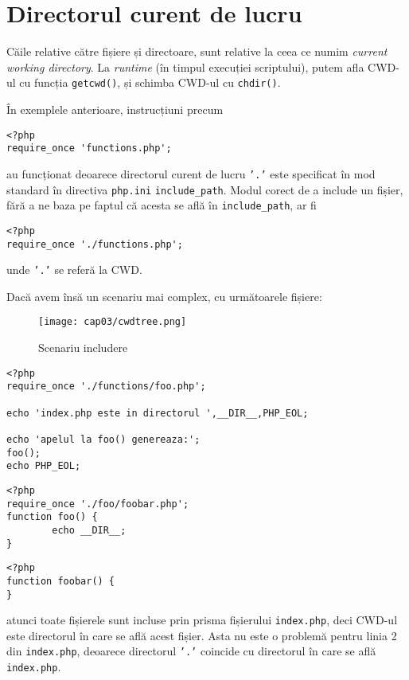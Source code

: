 \section{Directorul curent de lucru}
Căile relative către fișiere și directoare,
sunt relative la ceea ce numim \textsl{current working
directory}. La \textsl{runtime} (în timpul execuției
scriptului), putem afla CWD-ul cu
funcția \texttt{getcwd()}, și schimba CWD-ul cu \texttt{chdir()}.

În exemplele anterioare, instrucțiuni precum
\begin{lstlisting}
<?php
require_once 'functions.php';
\end{lstlisting}
au funcționat deoarece directorul curent de lucru \texttt{'.'}
este specificat în mod standard în directiva \texttt{php.ini}
\texttt{include\_path}. Modul corect de a include un fișier, fără
a ne baza pe faptul că acesta se află în \texttt{include\_path}, ar fi
\begin{lstlisting}
<?php
require_once './functions.php';
\end{lstlisting}
unde \texttt{'.'} se referă la CWD.

Dacă avem însă un scenariu mai complex, cu următoarele fișiere:
\begin{figure}[ht!]
  \centering
    \texttt{[image: cap03/cwdtree.png]}
  \caption{Scenariu includere}
  \label{fig:cwdtree}
\end{figure}

\begin{lstlisting}[title=index.php]
<?php
require_once './functions/foo.php';

echo 'index.php este in directorul ',__DIR__,PHP_EOL;

echo 'apelul la foo() genereaza:';
foo();
echo PHP_EOL;
\end{lstlisting}

\begin{lstlisting}[title=functions/foo.php]
<?php
require_once './foo/foobar.php';
function foo() {
        echo __DIR__;
}
\end{lstlisting}

\begin{lstlisting}[title=functions/foo/foobar.php]
<?php
function foobar() {
}
\end{lstlisting}

atunci toate fișierele sunt incluse prin prisma fișierului
\texttt{index.php}, deci CWD-ul este directorul
în care se află acest fișier. Asta nu este
o problemă pentru linia 2 din \texttt{index.php},
deoarece directorul \texttt{'.'} coincide
cu directorul în care se află \texttt{index.php}.

